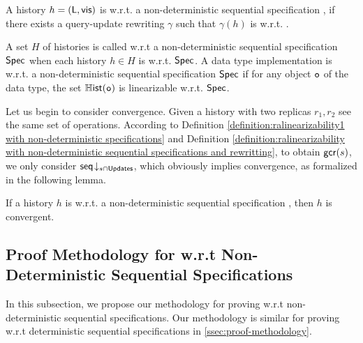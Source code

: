 {\begin{definition}
\label{definition:ralinearizability with non-deterministic sequential specifications and rewritting}
A history $h =(\mathsf{L},\mathsf{vis})$ is \crdtlinearizable{} w.r.t. a non-deterministic sequential specification \Spec{}, if there exists a query-update rewriting $\gamma$ such that $\gamma(h)$ is \crdtlinearizable{} w.r.t. \Spec{}.
\end{definition}

A set $H$ of histories is called \crdtlinearizable{} w.r.t a non-deterministic sequential specification $\mathsf{Spec}$ when each history $h\in H$ is \crdtlinearizable{} w.r.t. $\mathsf{Spec}$. A data type implementation is \crdtlinearizable{} w.r.t. a non-deterministic sequential specification $\mathsf{Spec}$ if for any object $\mathtt{o}$ of the data type, the set $\mathbb{H}\mathsf{ist}(\mathtt{o})$ is linearizable w.r.t. $\mathsf{Spec}$.

Let us begin to consider convergence. Given a \crdtlinearizable{} history with two replicas $r_1,r_2$ see the same set of operations. According to Definition \ref{definition:ralinearizability1 with non-deterministic specifications} and Definition \ref{definition:ralinearizability with non-deterministic sequential specifications and rewritting}, to obtain $\mathsf{gcr}(s)$, we only consider $\mathsf{seq}\!\downarrow_{s\cap \mathsf{Updates}}$, which obviously implies convergence, as formalized in the following lemma.

\begin{lemma}
\label{lemma:distributed linarizability implies convergence for non-deterministic sequential specifications}
If a history $h$ is \crdtlinearizable{} w.r.t. a non-deterministic sequential specification \Spec, then $h$ is convergent.
\end{lemma}






\subsection{Proof Methodology for \crdtlin{} w.r.t Non-Deterministic Sequential Specifications}
\label{subsec:appendix proof methodology for RA-linearizability w.r.t non-deterministic sequential specifications}

In this subsection, we propose our methodology for proving \crdtlin{} w.r.t non-deterministic sequential specifications. Our methodology is similar for proving \crdtlin{} w.r.t deterministic sequential specifications in \sectionautorefname \ref{ssec:proof-methodology}.

}

